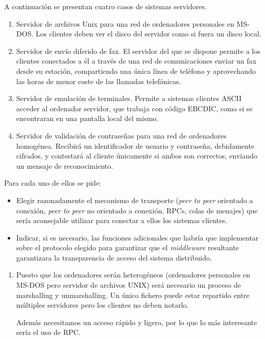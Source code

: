   \begin{problem}[14]
  A continuación se presentan cuatro casos de sistemas servidores.
  \begin{enumerate}
    \item Servidor de archivos Unix para una red de ordenadores personales en MS-DOS.
    Los clientes deben ver el disco del servidor como si fuera un disco local.
    \item Servidor de envío diferido de fax. El servidor del que se dispone permite a
los clientes conectados a él a través de una red de comunicaciones enviar un
fax desde su estación, compartiendo una única línea de teléfono y aprovechando
las horas de menor coste de las llamadas telefónicas.
    \item Servidor de emulación de terminales. Permite a sistemas clientes
ASCII acceder al ordenador servidor, que trabaja con código EBCDIC, como si se
encontraran en una pantalla local del mismo.
    \item Servidor de validación de contraseñas para una red de ordenadores
homogénea. Recibirá un identificador de usuario y contraseña, debidamente
cifrados, y contestará al cliente únicamente si ambos son correctos, enviando un mensaje de reconocimiento.
  \end{enumerate}
  Para cada uno de ellos se pide:
  \begin{itemize}
    \item Elegir razonadamente el mecanismo de transporte (\textit{peer to peer} orientado a conexión, \textit{peer to peer }no orientado a conexión, RPCs, colas de menajes) que sería aconsejable utilizar para conectar a ellos los sistemas clientes.
    \item Indicar, si es necesario, las funciones adicionales que
habría que implementar sobre el protocolo elegido para garantizar que el
 \textit{middleware }resultante garantizara la transparencia de acceso del sistema distribuido.
  \end{itemize}
    \solution


    \begin{enumerate}
    \item

    Puesto que los ordenadores serán heterogéneos (ordenadores personales en MS-DOS pero servidor de archivos UNIX)  será necesario un proceso de marshalling y unmarshalling. Un único fichero puede estar repartido entre múltiples servidores pero los clientes no deben notarlo.

    Además necesitamos un acceso rápido y ligero, por lo que lo más interesante sería el uso de RPC.



\end{enumerate}
\end{problem}

